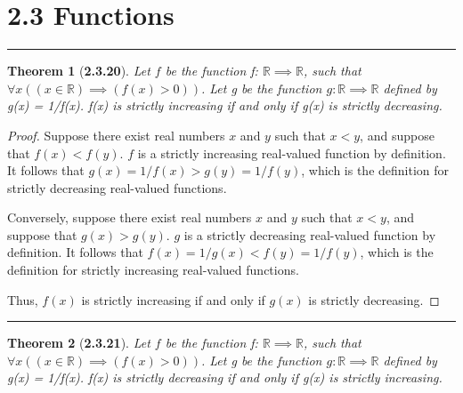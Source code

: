 \documentclass[a4paper, 12pt]{article}
\theoremstyle{plain}
\newtheorem*{theorem*}{Theorem}
\begin{document}
\section*{2.3 Functions}
\begin{center}
    \rule{5.4in}{1pt}
\end{center}


\begin{theorem*}[\textbf{2.3.20}]
    Let $f$ be the function f: $\mathbb{R} \implies \mathbb{R}$, such that \newline 
    $\forall x ((x \in \mathbb{R}) \implies (f(x) > 0))$. Let g be the function 
    $g: \mathbb{R} \implies \mathbb{R}$ defined by g(x) = 1/f(x). f(x) is strictly increasing 
    if and only if g(x) is strictly decreasing.
\end{theorem*}

\begin{proof}
    Suppose there exist real numbers $x$ and $y$ such that $x < y$, and suppose that 
    $f(x) < f(y)$. $f$ is a strictly increasing real-valued function by definition. It 
    follows that $g(x) = 1/f(x) > g(y) = 1/f(y)$, which is the definition for strictly 
    decreasing real-valued functions.
    
    Conversely, suppose there exist real numbers $x$ and $y$ such that $x < y$, and suppose that 
    $g(x) > g(y)$. $g$ is a strictly decreasing real-valued function by definition. It follows that 
    $f(x) = 1/g(x) < f(y) = 1/f(y)$, which is the definition for strictly increasing real-valued 
    functions.
    
    Thus, $f(x)$ is strictly increasing if and only if $g(x)$ is strictly decreasing.
\end{proof}
\begin{center}
    \rule{5.4in}{1pt}
\end{center}


\begin{theorem*}[\textbf{2.3.21}]
    Let $f$ be the function f: $\mathbb{R} \implies \mathbb{R}$, such that \newline 
    $\forall x ((x \in \mathbb{R}) \implies (f(x) > 0))$. Let g be the function 
    $g: \mathbb{R} \implies \mathbb{R}$ defined by g(x) = 1/f(x). f(x) is strictly decreasing 
    if and only if g(x) is strictly increasing.
\end{theorem*}
\end{document}
